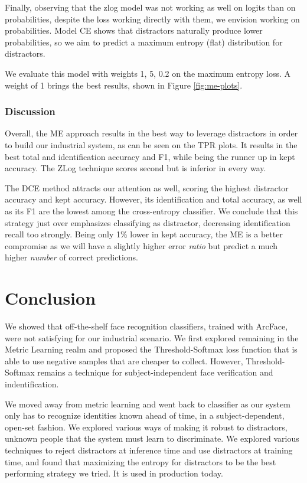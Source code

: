 Finally, observing that the zlog model was not working as well on logits than on probabilities, despite the loss working directly with them, we envision working on probabilities. Model CE shows that distractors naturally produce lower probabilities, so we aim to predict a maximum entropy (flat) distribution for distractors.

We evaluate this model with weights 1, 5, 0.2 on the maximum entropy loss. A weight of 1 brings the best results, shown in Figure \ref{fig:me-plots}.

\subsubsection{Discussion}

Overall, the ME approach results in the best way to leverage distractors in order to build our industrial system, as can be seen on the TPR plots. It results in the best total and identification accuracy and F1, while being the runner up in kept accuracy. The ZLog technique scores second but is inferior in every way.

The DCE method attracts our attention as well, scoring the highest distractor accuracy and kept accuracy. However, its identification and total accuracy, as well as its F1 are the lowest among the cross-entropy classifier. We conclude that this strategy just over emphasizes classifying as distractor, decreasing identification recall too strongly. Being only 1\% lower in kept accuracy, the ME is a better compromise as we will have a slightly higher error \emph{ratio} but predict a much higher \emph{number} of correct predictions.

\section{Conclusion}

We showed that off-the-shelf  face recognition classifiers, trained with ArcFace, were not satisfying for our industrial scenario. We first explored remaining in the Metric Learning realm and proposed the Threshold-Softmax loss function that is able to use negative samples that are cheaper to collect. However, Threshold-Softmax remains a technique for subject-independent face verification and indentification.

We moved away from metric learning and went back to classifier as our system only has to recognize identities known ahead of time, in a subject-dependent, open-set fashion. We explored various ways of making it robust to distractors, unknown people that the system must learn to discriminate. We explored various techniques to reject distractors at inference time and use distractors at training time, and found that maximizing the entropy for distractors to be the best performing strategy we tried. It is used in production today.


